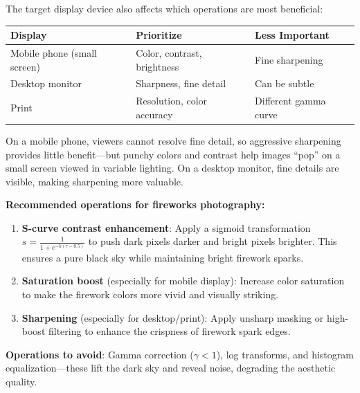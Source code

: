 \documentclass[12pt]{article}
\begin{document}
\begin{stepbox}

The target display device also affects which operations are most beneficial:

\vspace{0.2cm}
\begin{center}
\begin{tabular}{|l|l|l|}
\hline
\textbf{Display} & \textbf{Prioritize} & \textbf{Less Important} \\
\hline
Mobile phone (small screen) & Color, contrast, brightness & Fine sharpening \\
\hline
Desktop monitor & Sharpness, fine detail & Can be subtle \\
\hline
Print & Resolution, color accuracy & Different gamma curve \\
\hline
\end{tabular}
\end{center}

\vspace{0.2cm}

On a mobile phone, viewers cannot resolve fine detail, so aggressive sharpening provides little benefit---but punchy colors and contrast help images ``pop'' on a small screen viewed in variable lighting. On a desktop monitor, fine details are visible, making sharpening more valuable.

\end{stepbox}

\begin{resultsbox}

\textbf{Recommended operations for fireworks photography:}

\begin{enumerate}[leftmargin=2em]
\item \textbf{S-curve contrast enhancement}: Apply a sigmoid transformation $s = \frac{1}{1 + e^{-k(r-0.5)}}$ to push dark pixels darker and bright pixels brighter. This ensures a pure black sky while maintaining bright firework sparks.

\item \textbf{Saturation boost} (especially for mobile display): Increase color saturation to make the firework colors more vivid and visually striking.

\item \textbf{Sharpening} (especially for desktop/print): Apply unsharp masking or high-boost filtering to enhance the crispness of firework spark edges.
\end{enumerate}

\vspace{0.2cm}
\textbf{Operations to avoid}: Gamma correction ($\gamma < 1$), log transforms, and histogram equalization---these lift the dark sky and reveal noise, degrading the aesthetic quality.

\end{resultsbox}
\end{document}
